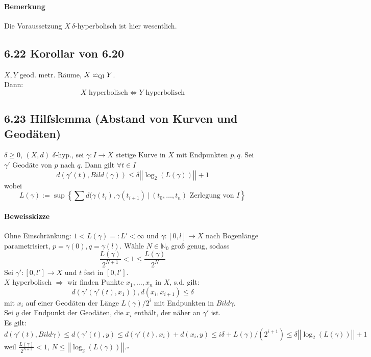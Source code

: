 \documentclass{article}
\newcommand{\N}{\mathbb{N}}
\newcommand{\set}[2]{\left\lbrace #1~|~#2 \right\rbrace}
\newcommand{\qed}{$\square$}
\newcommand{\qi}{\backsimeq_{\textsc{QI}}}
\newcommand{\norm}[1]{\left|\left|#1\right|\right|}
\begin{document}
\paragraph{Bemerkung} Die Voraussetzung $X ~\delta$-hyperbolisch ist hier wesentlich.

\subsection{6.22 Korollar von 6.20}
$X,Y$ geod. metr. Räume, $X \qi Y$.\\
Dann:
\[X \text{ hyperbolisch} \Longleftrightarrow Y \text{ hyperbolisch} \]

\subsection{6.23 Hilfslemma (Abstand von Kurven und Geodäten)}
$\delta \geq 0$, $(X,d)$ $\delta$-hyp., sei $\gamma : I \rightarrow X$ stetige Kurve in $X$ mit Endpunkten $p,q$. Sei $\gamma'$ Geodäte von $p$ nach $q$. Dann gilt $\forall t\in I$
\[d(\gamma'(t), Bild(\gamma)) \leq \delta \norm{\log_2(L(\gamma))} + 1 \]
wobei 
\[L(\gamma) := \sup \set{\sum d(\gamma(t_i), \gamma(t_{i+1})}{(t_0, \ldots, t_n) \text{ Zerlegung von } I} \]

\paragraph{Beweisskizze}
Ohne Einschränkung: $1 < L(\gamma) =: L' < \infty$ und $\gamma: [0,l] \rightarrow X$ nach Bogenlänge parametrisiert, $p = \gamma(0), q = \gamma(l)$. Wähle $N \in \N_0$ groß genug, sodass
\[\frac{L(\gamma)}{2^{N+1}} < 1 \leq \frac{L(\gamma)}{2^N} \]
Sei $\gamma' : [0, l'] \rightarrow X$ und $t$ fest in $[0, l']$.\\
$X$ hyperbolisch $\Longrightarrow$ wir finden Punkte $x_1, \ldots, x_n$ in $X$, s.d. gilt:
\[d(\gamma'(\gamma'(t), x_1) ) , d(x_i, x_{i+1}) \leq \delta \]
mit $x_i$ auf einer Geodäten der Länge $L(\gamma)/2^i$ mit Endpunkten in $Bild \gamma$.\\
Sei $y$ der Endpunkt der Geodäten, die $x_i$ enthält, der näher an $\gamma'$ ist.\\
Es gilt:
\[d(\gamma'(t) , Bild \gamma) \leq d(\gamma'(t), y) \leq d(\gamma'(t), x_i) + d(x_i,y) \leq i \delta + L(\gamma)/(2^{i+1}) \leq \delta \norm{\log_2(L(\gamma))} + 1 \]
weil $\frac{L(\gamma)}{2^{N+1}} < 1$, $N \leq \norm{\log_2(L(\gamma))}$.\qed
\end{document}
